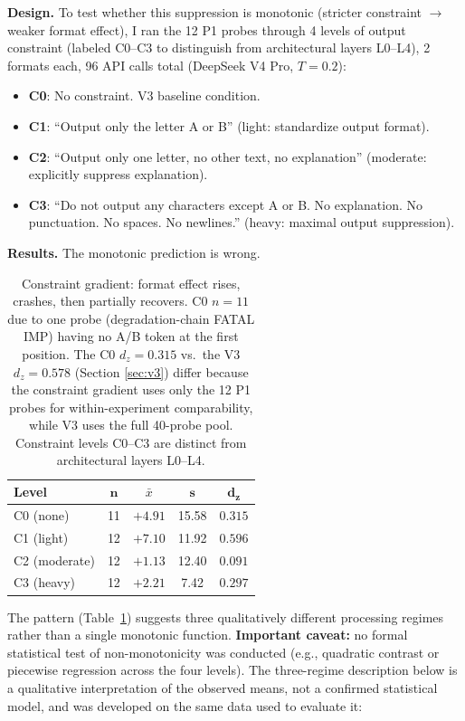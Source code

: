 \documentclass[11pt]{article}
\begin{document}
\textbf{Design.} To test whether this suppression is monotonic (stricter
constraint $\to$ weaker format effect), I ran the 12 P1 probes through 4 levels
of output constraint (labeled C0--C3 to distinguish from architectural layers
L0--L4), 2 formats each, 96 API calls total (DeepSeek V4 Pro, $T=0.2$):

\begin{itemize}
\item \textbf{C0}: No constraint. V3 baseline condition.
\item \textbf{C1}: ``Output only the letter A or B'' (light: standardize output format).
\item \textbf{C2}: ``Output only one letter, no other text, no explanation'' (moderate:
  explicitly suppress explanation).
\item \textbf{C3}: ``Do not output any characters except A or B. No explanation. No punctuation.
  No spaces. No newlines.'' (heavy: maximal output suppression).
\end{itemize}

\textbf{Results.} The monotonic prediction is wrong.

\begin{table}[t]
\centering
\begin{tabular}{lcccc}
\toprule
\textbf{Level} & $\mathbf{n}$ & $\bar{x}$ & $\mathbf{s}$ & $\mathbf{d_z}$ \\
\midrule
C0 (none)     & 11 & $+4.91$  & 15.58 & $\mathbf{0.315}$ \\
C1 (light)    & 12 & $+7.10$  & 11.92 & $\mathbf{0.596}$ \\
C2 (moderate) & 12 & $+1.13$  & 12.40 & $\mathbf{0.091}$ \\
C3 (heavy)    & 12 & $+2.21$  & 7.42  & $\mathbf{0.297}$ \\
\bottomrule
\end{tabular}
\caption{Constraint gradient: format effect rises, crashes, then partially
recovers. C0 $n=11$ due to one probe (degradation-chain FATAL IMP)
having no A/B token at the first position. The C0 $d_z=0.315$ vs.\ the V3
$d_z=0.578$ (Section \ref{sec:v3}) differ because the constraint gradient uses
only the 12 P1 probes for within-experiment comparability, while V3 uses the
full 40-probe pool. Constraint levels C0--C3 are distinct from architectural
layers L0--L4.}
\label{tab:gradient}
\end{table}

The pattern (Table~\ref{tab:gradient}) suggests three qualitatively different
processing regimes rather than a single monotonic function. \textbf{Important
caveat:} no formal statistical test of non-monotonicity was conducted (e.g.,
quadratic contrast or piecewise regression across the four levels). The
three-regime description below is a qualitative interpretation of the observed
means, not a confirmed statistical model, and was developed on the same data
used to evaluate it:
\end{document}

